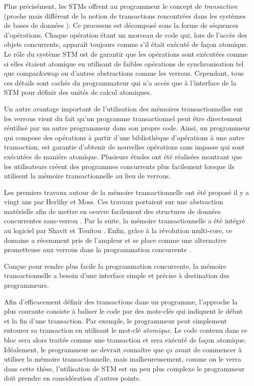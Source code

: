 Plus précisément, les STMs offrent au programmeur le concept de  {\it transaction} (proche mais différent de la notion de transactions rencontrées dans les systèmes de bases de données \cite{FFGH08, HCUAGSV07, HL08}).
Ce processus est décomposé sous la forme de séquences d'opérations.
Chaque opération étant un morceau de code qui, lors de l'accès des objets concurrents, apparaît toujours comme s'il était exécuté de façon atomique.
Le rôle du système STM est de garantir que les opérations sont exécutées comme si elles étaient atomique en utilisant de faibles opérations de synchronisation tel que compar\&swap ou d'autres abstractions comme les verrous. Cependant, tous ces détails sont cachés du programmateur qui 
n'a accès que à l'interface de la STM pour définir des unités de calcul atomiques.


Un autre avantage important de l'utilisation des mémoires transactionnelles sur les verrous vient du fait  
qu'un programme transactionnel peut être directement réutilisé par un autre programmeur dans son propre code.
Ainsi, un programmeur qui compose des opérations à partir d'une bibliothèque d'opérations à une 
autre transaction, est garantie d'obtenir de nouvelles opérations sans impasse qui sont exécutées de manière atomique.
Plusieurs études \cite{PA11, RHW10} ont été réalisées montrant que les utilisateurs créent des programmes concurrents plus facilement 
lorsque ils utilisent la mémoire transactionnelle au lieu de verrous.


Les premiers travaux autour de la mémoire transactionnelle ont été proposé il y a vingt ans par Herlihy et Moss. Ces travaux portaient sur une abstraction matérielle afin de mettre en oeuvre facilement des structures de données concurrentes sans-verrou \cite{HM93}.
Par la suite, la mémoire transactionnelle a été intégré au logiciel par Shavit et Touitou \cite{ST97}.
Enfin, grâce à la révolution multi-core, ce domaine a récemment pris de l'ampleur et se place comme une alternative prometteuse aux verrous dans la programmation concurrente \cite{FFGH08,HCUAGSV07,LK08,R08}.


Conçue pour rendre plus facile la programmation concurrente, la mémoire transactionnelle a
besoin d'une interface simple et précise à destination des programmeurs.

Afin d'efficacement définir des transactions dans un programme,
l'approche la plus courante consiste à baliser le code par des mots-clés qui indiquent le début et la fin d'une transaction.
Par exemple, le programmeur peut simplement entourer sa transaction en utilisant le mot-clé \emph{atomique}.
Le code contenu dans ce bloc sera alors traitée comme une transaction et sera exécuté de façon atomique.
Idéalement, le programmeur ne devrait connaître que ça avant de commencer à utiliser la mémoire transactionnelle,
mais malheureusement, comme on le verra dans cette thèse, l'utilisation de STM est un peu plus complexe le programmeur doit 
prendre en considération d'autres points.



